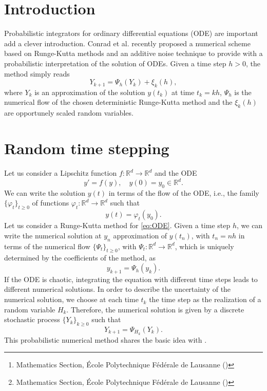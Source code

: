 \documentclass{siamart1116}
\title{{\TheTitle}}
\author{Assyr Abdulle\thanks{Mathematics Section, \'Ecole Polytechnique F\'ed\'erale de Lausanne (\email{assyr.abdulle@epfl.ch})}
	\and
	Giacomo Garegnani\thanks{Mathematics Section, \'Ecole Polytechnique F\'ed\'erale de Lausanne (\email{giacomo.garegnani@epfl.ch})}}
\numberwithin{theorem}{section}
\renewcommand{\phi}{\varphi}
\newcommand{\R}{\mathbb{R}}
\begin{document}
	
\maketitle	

\begin{abstract}
\end{abstract}

\section{Introduction} Probabilistic integrators for ordinary differential equations (ODE) are important {\color{red} add a clever introduction}. Conrad et al. \cite{CGS16} recently proposed a numerical scheme based on Runge-Kutta methods and an additive noise technique to provide with a probabilistic interpretation of the solution of ODEs. Given a time step $h > 0$, the method simply reads
\begin{equation}\label{eq:ProbMethAddNoise}
	Y_{k+1} = \Psi_h(Y_{k}) + \xi_k(h),
\end{equation}
where $Y_k$ is an approximation of the solution $y(t_k)$ at time $t_k = kh$, $\Psi_h$ is the numerical flow of the chosen deterministic Runge-Kutta method and the $\xi_k(h)$ are opportunely scaled random variables.

\section{Random time stepping}

Let us consider a Lipschitz function $f\colon\R^d\to\R^d$ and the ODE
\begin{equation}\label{eq:ODE}
	y' = f(y), \quad y(0) = y_0 \in \R^d.
\end{equation}
We can write the solution $y(t)$ in terms of the flow of the ODE, i.e., the family $\{\phi_t\}_{t \geq 0}$ of functions $\phi_t\colon\R^d\to\R^d$ such that 
\begin{equation}
	y(t) = \phi_t(y_0).
\end{equation}
Let us consider a Runge-Kutta method for \eqref{eq:ODE}. Given a time step $h$, we can write the numerical solution at $y_n$ approximation of $y(t_n)$, with $t_n = nh$ in terms of the numerical flow $\{\Psi_t\}_{t \geq 0}$, with $\Psi_t\colon\R^d\to\R^d$, which is uniquely determined by the coefficients of the method, as
\begin{equation}
	y_{k+1} = \Psi_h(y_k).
\end{equation}
If the ODE is chaotic, integrating the equation with different time steps leads to different numerical solutions. In order to describe the uncertainty of the numerical solution, we choose at each time $t_k$ the time step as the realization of a random variable $H_k$. Therefore, the numerical solution is given by a discrete stochastic process $\{Y_k\}_{k\geq 0}$ such that
\begin{equation}\label{eq:ProbMethVarH}
	Y_{k+1} = \Psi_{H_k}(Y_k).
\end{equation}
This probabilistic numerical method shares the basic idea with \cite{CGS16}. 
\end{document}
